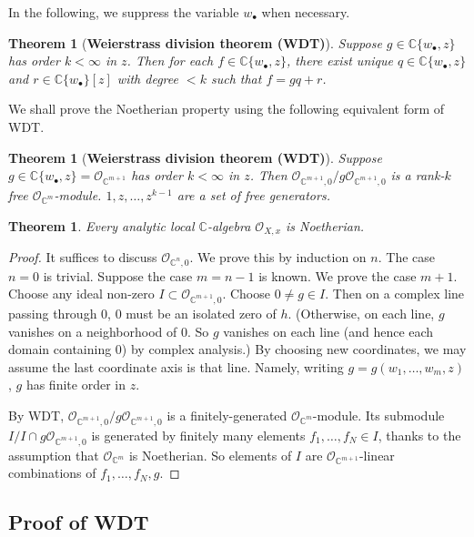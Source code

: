 \documentclass[12pt,b5paper,notitlepage]{report}
\theoremstyle{definition}
\theoremstyle{plain}
\newtheorem{thm}[df]{Theorem}
\newcommand{\scr}{\mathscr}
\newcommand{\blt}{\bullet}
\newcommand{\Cbb}{\mathbb C}
\numberwithin{equation}{section}
\begin{document}
In the following, we suppress the variable $w_\blt$ when necessary.

\begin{thm}[\textbf{Weierstrass division theorem (WDT)}] 
Suppose $g\in\Cbb\{w_\blt,z\}$ has order $k<\infty$ in $z$. Then for each $f\in\Cbb\{w_\blt,z\}$, there exist unique $q\in\Cbb\{w_\blt,z\}$ and $r\in\Cbb\{w_\blt\}[z]$ with degree $<k$ such that $f=gq+r$.
\end{thm}


We shall prove the Noetherian property using the following equivalent form of WDT.
\begin{thm}[\textbf{Weierstrass division theorem (WDT)}] 
Suppose $g\in\Cbb\{w_\blt,z\}=\scr O_{\Cbb^{m+1}}$ has order $k<\infty$ in $z$. Then $\scr O_{\Cbb^{m+1},0}/g\scr O_{\Cbb^{m+1},0}$ is a rank-$k$ free $\scr O_{\Cbb^m}$-module. $1,z,\dots,z^{k-1}$ are a set of free generators.
\end{thm}


\begin{thm}
Every analytic local $\Cbb$-algebra $\scr O_{X,x}$ is Noetherian.
\end{thm}

\begin{proof}
It suffices to discuss $\scr O_{\Cbb^n,0}$. We prove this by induction on $n$. The case $n=0$ is trivial. Suppose the case $m=n-1$ is known. We prove the case $m+1$. Choose any ideal non-zero $I\subset\scr O_{\Cbb^{m+1},0}$. Choose $0\neq g\in I$. Then  on a complex line passing through $0$, $0$ must be an isolated zero of $h$. (Otherwise, on each line, $g$ vanishes on a neighborhood of $0$. So $g$ vanishes on each line (and hence each domain containing $0$) by complex analysis.) By choosing new coordinates, we may assume the last coordinate axis is that line. Namely, writing $g=g(w_1,\dots,w_m,z)$, $g$ has finite order in $z$.

By WDT, $\scr O_{\Cbb^{m+1},0}/g\scr O_{\Cbb^{m+1},0}$ is a finitely-generated $\scr O_{\Cbb^m}$-module. Its submodule $I/I\cap g\scr O_{\Cbb^{m+1},0}$ is generated by finitely many elements $f_1,\dots,f_N\in I$, thanks to the assumption that $\scr O_{\Cbb^m}$ is Noetherian. So elements of $I$ are  $\scr O_{\Cbb^{m+1}}$-linear combinations of $f_1,\dots,f_N,g$.
\end{proof}


\subsection{Proof of WDT}
\end{document}
